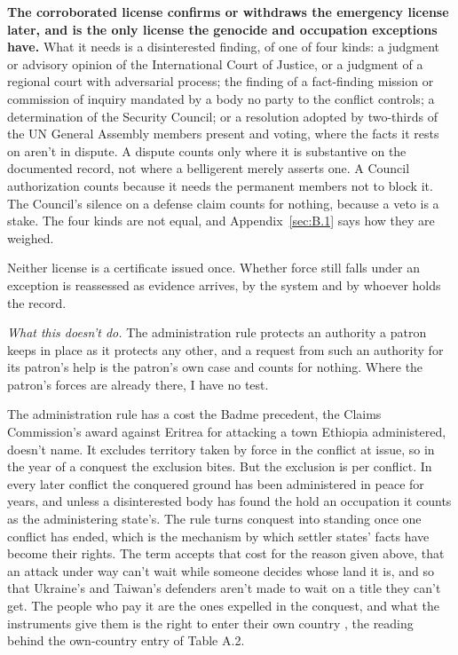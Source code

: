 \textbf{The corroborated license confirms or withdraws the emergency license later, and is the only license the genocide and occupation exceptions have.} What it needs is a disinterested finding, of one of four kinds: a judgment or advisory opinion of the International Court of Justice, or a judgment of a regional court with adversarial process; the finding of a fact-finding mission or commission of inquiry mandated by a body no party to the conflict controls; a determination of the Security Council; or a resolution adopted by two-thirds of the UN General Assembly members present and voting, where the facts it rests on aren't in dispute. A dispute counts only where it is substantive on the documented record, not where a belligerent merely asserts one. A Council authorization counts because it needs the permanent members not to block it. The Council's silence on a defense claim counts for nothing, because a veto is a stake. The four kinds are not equal, and Appendix~\ref{sec:B.1} says how they are weighed.

Neither license is a certificate issued once. Whether force still falls under an exception is reassessed as evidence arrives, by the system and by whoever holds the record.

\emph{What this doesn't do.} The administration rule protects an authority a patron keeps in place as it protects any other, and a request from such an authority for its patron's help is the patron's own case and counts for nothing. Where the patron's forces are already there, I have no test.

The administration rule has a cost the Badme precedent, the Claims Commission's award against Eritrea for attacking a town Ethiopia administered, doesn't name. It excludes territory taken by force in the conflict at issue, so in the year of a conquest the exclusion bites. But the exclusion is per conflict. In every later conflict the conquered ground has been administered in peace for years, and unless a disinterested body has found the hold an occupation it counts as the administering state's. The rule turns conquest into standing once one conflict has ended, which is the mechanism by which settler states' facts have become their rights. The term accepts that cost for the reason given above, that an attack under way can't wait while someone decides whose land it is, and so that Ukraine's and Taiwan's defenders aren't made to wait on a title they can't get. The people who pay it are the ones expelled in the conquest, and what the instruments give them is the right to enter their own country \autocite{hrc1999gc27}, the reading behind the own-country entry of Table A.2.

